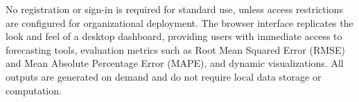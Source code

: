 No registration or sign-in is required for standard use, unless access restrictions are configured for organizational deployment. The browser interface replicates the look and feel of a desktop dashboard, providing users with immediate access to forecasting tools, evaluation metrics such as Root Mean Squared Error (RMSE) and Mean Absolute Percentage Error (MAPE), and dynamic visualizations. All outputs are generated on demand and do not require local data storage or computation.